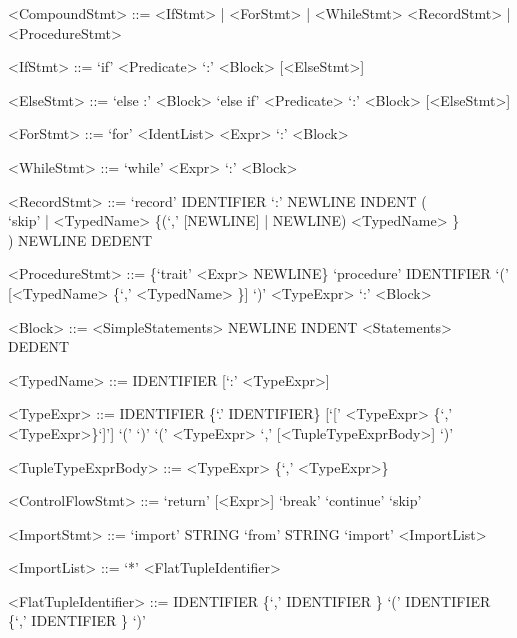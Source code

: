 \begin{grammar}
<CompoundStmt> ::= <IfStmt> | <ForStmt> | <WhileStmt>
    \alt <RecordStmt> | <ProcedureStmt>

<IfStmt> ::= `if' <Predicate> `:' <Block> [<ElseStmt>]

<ElseStmt> ::= `else :' <Block>
    \alt `else if' <Predicate> `:' <Block> [<ElseStmt>]

<ForStmt> ::= `for' <IdentList> \lit{$\in$} <Expr> `:' <Block>

<WhileStmt> ::= `while' <Expr> `:' <Block>

<RecordStmt> ::= `record' IDENTIFIER `:' NEWLINE INDENT ( \\
        `skip' | <TypedName> \{(`,' [NEWLINE] | NEWLINE) <TypedName> \} \\
    ) NEWLINE DEDENT

<ProcedureStmt> ::= \{`trait' <Expr> NEWLINE\} `procedure' IDENTIFIER `(' [<TypedName> \{`,' <TypedName> \}] `)' \lit{$\rightarrow$} <TypeExpr> `:' <Block>

<Block> ::= <SimpleStatements>
    \alt NEWLINE INDENT <Statements> DEDENT

<TypedName> ::= IDENTIFIER [`:' <TypeExpr>]

<TypeExpr> ::= IDENTIFIER \{`.' IDENTIFIER\} [`[' <TypeExpr> \{`,' <TypeExpr>\}`]']
    \alt `(' `)'
    \alt `(' <TypeExpr> `,' [<TupleTypeExprBody>] `)'

<TupleTypeExprBody> ::= <TypeExpr> \{`,' <TypeExpr>\}

<ControlFlowStmt> ::= `return' [<Expr>]
    \alt `break'
    \alt `continue'
    \alt `skip'

<ImportStmt> ::= `import' STRING
    \alt `from' STRING `import' <ImportList>

<ImportList> ::= `*'
    \alt <FlatTupleIdentifier>

<FlatTupleIdentifier> ::= IDENTIFIER \{`,' IDENTIFIER \}
    \alt `(' IDENTIFIER \{`,' IDENTIFIER \} `)'

\end{grammar}
